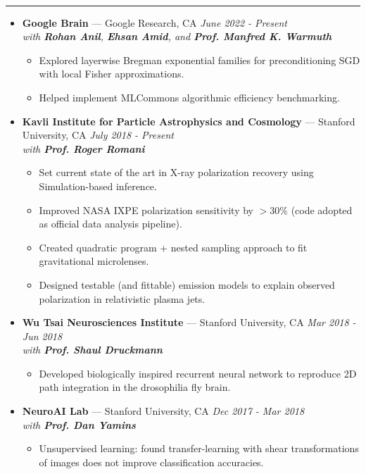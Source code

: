 \documentclass[11pt, oneside]{article}
\newenvironment{ressection}[1]{
	\vspace{4pt}
	{\selectfont\Large\color{Mycolor2}{\textbf{#1}}}
	\vspace{-6.5pt} \\
	\textcolor{Mycolor2}{\rule{\textwidth}{0.7pt}}
	\begin{itemize}
	\vspace{3pt}
}{
	\end{itemize}
}
\newcommand{\ressubitem}{
	\vspace{-4pt}
	\item
}
\newcommand{\resbigitem}[3]{
	\vspace{-5pt}
	\item[]
	\textbf{#1} --- #2 %
	\hfill
	\textit{#3}
}
\newenvironment{ressubsec}[3]{
	\resbigitem{#1}{#2}{#3}
	\vspace{-2pt}
	\begin{itemize}
}{
	\end{itemize}
}
\begin{document}
\begin{ressection}{\textbf{Research}}

\vspace{2pt}
\begin{ressubsec}{Google Brain}{Google Research, CA}{June 2022 - Present \\ with \textbf{Rohan Anil}, \textbf{Ehsan Amid}, and \textbf{Prof. Manfred K. Warmuth}}
	\ressubitem{Explored layerwise Bregman exponential families for preconditioning SGD with local Fisher approximations.}
	\ressubitem{Helped implement MLCommons algorithmic efficiency benchmarking.}
\end{ressubsec}

	\vspace{2pt}
	\begin{ressubsec}{Kavli Institute for Particle Astrophysics and Cosmology}{Stanford University, CA}{July 2018 - Present \\ with \textbf{Prof. Roger Romani}}
\ressubitem{Set current state of the art in X-ray polarization recovery using Simulation-based inference.}
\ressubitem{Improved NASA IXPE polarization sensitivity by $>30\%$ (code adopted as official data analysis pipeline).}
\ressubitem{Created quadratic program + nested sampling approach to fit gravitational microlenses.}
		\ressubitem{Designed testable (and fittable) emission models to explain observed polarization in relativistic plasma jets.}
	\end{ressubsec}

	\vspace{2pt}
	\begin{ressubsec}{Wu Tsai Neurosciences Institute}{Stanford University, CA}{Mar 2018 - Jun 2018 \\ with \textbf{Prof. Shaul Druckmann}}
\ressubitem{Developed biologically inspired recurrent neural network to reproduce 2D path integration in the drosophilia fly brain.}
	\end{ressubsec}

	\vspace{2pt}
	\begin{ressubsec}{NeuroAI Lab}{Stanford University, CA}{Dec 2017 - Mar 2018 \\ with \textbf{Prof. Dan Yamins}}
	\ressubitem{Unsupervised learning: found transfer-learning with shear transformations of images does not improve classification accuracies.}
	\end{ressubsec}


\end{ressection}
\end{document}
